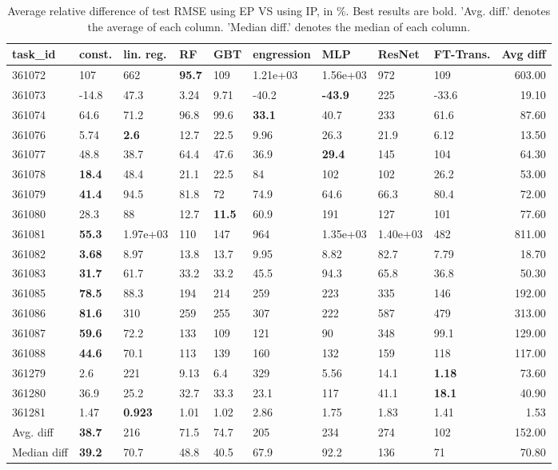 \begin{table}[ht!]
\centering
\begingroup\footnotesize
\begin{tabular}{lllllllllr}
  \hline
\hline
task\_id & const. & lin. reg. & RF & GBT & engression & MLP & ResNet & FT-Trans. & Avg diff \\ 
  \hline
361072 & 107 & 662 & \textbf{95.7} & 109 & 1.21e+03 & 1.56e+03 & 972 & 109 & 603.00 \\ 
  361073 & -14.8 & 47.3 & 3.24 & 9.71 & -40.2 & \textbf{-43.9} & 225 & -33.6 & 19.10 \\ 
  361074 & 64.6 & 71.2 & 96.8 & 99.6 & \textbf{33.1} & 40.7 & 233 & 61.6 & 87.60 \\ 
  361076 & 5.74 & \textbf{2.6} & 12.7 & 22.5 & 9.96 & 26.3 & 21.9 & 6.12 & 13.50 \\ 
  361077 & 48.8 & 38.7 & 64.4 & 47.6 & 36.9 & \textbf{29.4} & 145 & 104 & 64.30 \\ 
  361078 & \textbf{18.4} & 48.4 & 21.1 & 22.5 & 84 & 102 & 102 & 26.2 & 53.00 \\ 
  361079 & \textbf{41.4} & 94.5 & 81.8 & 72 & 74.9 & 64.6 & 66.3 & 80.4 & 72.00 \\ 
  361080 & 28.3 & 88 & 12.7 & \textbf{11.5} & 60.9 & 191 & 127 & 101 & 77.60 \\ 
  361081 & \textbf{55.3} & 1.97e+03 & 110 & 147 & 964 & 1.35e+03 & 1.40e+03 & 482 & 811.00 \\ 
  361082 & \textbf{3.68} & 8.97 & 13.8 & 13.7 & 9.95 & 8.82 & 82.7 & 7.79 & 18.70 \\ 
  361083 & \textbf{31.7} & 61.7 & 33.2 & 33.2 & 45.5 & 94.3 & 65.8 & 36.8 & 50.30 \\ 
  361085 & \textbf{78.5} & 88.3 & 194 & 214 & 259 & 223 & 335 & 146 & 192.00 \\ 
  361086 & \textbf{81.6} & 310 & 259 & 255 & 307 & 222 & 587 & 479 & 313.00 \\ 
  361087 & \textbf{59.6} & 72.2 & 133 & 109 & 121 & 90 & 348 & 99.1 & 129.00 \\ 
  361088 & \textbf{44.6} & 70.1 & 113 & 139 & 160 & 132 & 159 & 118 & 117.00 \\ 
  361279 & 2.6 & 221 & 9.13 & 6.4 & 329 & 5.56 & 14.1 & \textbf{1.18} & 73.60 \\ 
  361280 & 36.9 & 25.2 & 32.7 & 33.3 & 23.1 & 117 & 41.1 & \textbf{18.1} & 40.90 \\ 
  361281 & 1.47 & \textbf{0.923} & 1.01 & 1.02 & 2.86 & 1.75 & 1.83 & 1.41 & 1.53 \\ 
   \hline
Avg. diff & \textbf{38.7} & 216 & 71.5 & 74.7 & 205 & 234 & 274 & 102 & 152.00 \\ 
  Median diff & \textbf{39.2} & 70.7 & 48.8 & 40.5 & 67.9 & 92.2 & 136 & 71 & 70.80 \\ 
   \hline
\hline
\end{tabular}
\endgroup
\caption{Average relative difference of test RMSE using EP VS using IP, in \%. 
                  Best results are bold. 
                  'Avg. diff.' denotes the average of each column.
                  'Median diff.' denotes the median of each column.} 
\label{TABLES/table_results_RMSE_spatial_depth_only_num_features_EP_VS_IP}
\end{table}
